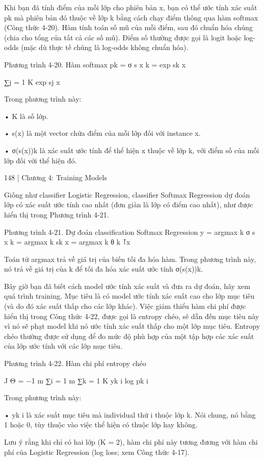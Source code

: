 Khi bạn đã tính điểm của mỗi lớp cho phiên bản x, bạn có thể ước tính xác suất pk mà phiên bản đó thuộc về lớp k bằng cách chạy điểm thông qua hàm softmax (Công thức 4-20). Hàm tính toán số mũ của mỗi điểm, sau đó chuẩn hóa chúng (chia cho tổng của tất cả các số mũ). Điểm số thường được gọi là logit hoặc log-odds (mặc dù thực tế chúng là log-odds không chuẩn hóa).

Phương trình 4-20. Hàm softmax pk = σ s x k = exp sk x

∑j = 1 K exp sj x

Trong phương trình này:

• K là số lớp.

• s(x) là một vector chứa điểm của mỗi lớp đối với instance x.

• σ(s(x))k là xác suất ước tính để thể hiện x thuộc về lớp k, với điểm số của mỗi lớp đối với thể hiện đó.

148 | Chương 4: Training Models

Giống như classifier Logistic Regression, classifier Softmax Regression dự đoán lớp có xác suất ước tính cao nhất (đơn giản là lớp có điểm cao nhất), như được hiển thị trong Phương trình 4-21.

Phương trình 4-21. Dự đoán classification Softmax Regression y = argmax k σ s x k = argmax k sk x = argmax k θ k ⊺x

Toán tử argmax trả về giá trị của biến tối đa hóa hàm. Trong phương trình này, nó trả về giá trị của k để tối đa hóa xác suất ước tính σ(s(x))k.

Bây giờ bạn đã biết cách model ước tính xác suất và đưa ra dự đoán, hãy xem quá trình training. Mục tiêu là có model ước tính xác suất cao cho lớp mục tiêu (và do đó xác suất thấp cho các lớp khác). Việc giảm thiểu hàm chi phí được hiển thị trong Công thức 4-22, được gọi là entropy chéo, sẽ dẫn đến mục tiêu này vì nó sẽ phạt model khi nó ước tính xác suất thấp cho một lớp mục tiêu. Entropy chéo thường được sử dụng để đo mức độ phù hợp của một tập hợp các xác suất của lớp ước tính với các lớp mục tiêu.

Phương trình 4-22. Hàm chi phí entropy chéo

J Θ = −1 m ∑i = 1 m ∑k = 1 K yk i log pk i

Trong phương trình này:

• yk i là xác suất mục tiêu mà individual thứ i thuộc lớp k. Nói chung, nó bằng 1 hoặc 0, tùy thuộc vào việc thể hiện có thuộc lớp hay không.

Lưu ý rằng khi chỉ có hai lớp (K = 2), hàm chi phí này tương đương với hàm chi phí của Logistic Regression (log loss; xem Công thức 4-17).

